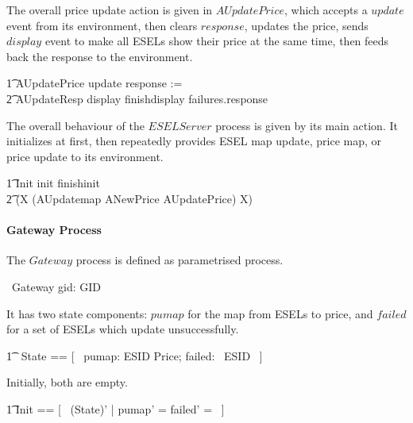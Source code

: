 The overall price update action is given in $AUpdatePrice$, which accepts a $update$ event from its environment, then clears $response$, updates the price, sends $display$ event to make all ESELs show their price at the same time, then feeds back the response to the environment.
\begin{circusaction}
        \t1 AUpdatePrice \circdef update \then response := \emptyset \circseq \\
            \t2 AUpdateResp \circseq display \then finishdisplay \then failures.response \then \Skip \\ 
\end{circusaction}

The overall behaviour of the $ESELServer$ process is given by its main action. It initializes at first, then repeatedly provides ESEL map update, price map, or price update to its environment.
\begin{circusaction}
	\t1 \circspot \lschexpract Init \rschexpract \circseq init \then finishinit \then \Skip \circseq \\
    \t2 (\circmu X \circspot (AUpdatemap \extchoice ANewPrice \extchoice AUpdatePrice) \circseq X) \\
\end{circusaction}
\begin{circus}
	\circend
\end{circus}

\paragraph{Gateway Process}

The $Gateway$ process is defined as parametrised process.
\begin{circus}
	\circprocess\ Gateway \circdef gid: GID \circspot \circbegin \\
\end{circus}

It has two state components: $pumap$ for the map from ESELs to price, and $failed$ for a set of ESELs which update unsuccessfully.
\begin{circusaction}
    	\t1 \circstate\ State == [~ pumap: ESID \pfun Price; failed: \power~ESID ~]
\end{circusaction}

Initially, both are empty.
\begin{zed}
    	\t1	Init == [~ (State)' | pumap' = \emptyset \land failed' = \emptyset ~]
\end{zed}

